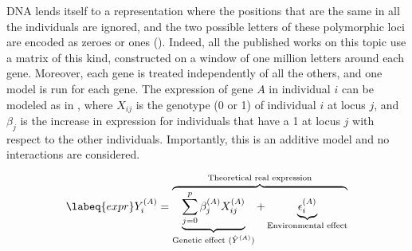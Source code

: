 DNA lends itself to a representation where the positions that are the 
same in all the individuals are ignored, and the two possible letters of 
these polymorphic loci are encoded as zeroes or ones 
(). Indeed, all the published works on this topic 
use a matrix of this kind, constructed on a window of one million 
letters around each gene. Moreover, each gene is treated independently 
of all the others, and one model is run for each gene. The expression of 
gene $A$ in individual $i$ can be modeled as in , where 
$X_{ij}$ is the genotype (0 or 1) of individual $i$ at locus $j$, and 
$\beta_j$ is the increase in expression for individuals that have a 1 at 
locus $j$ with respect to the other individuals. Importantly, this is an 
additive model and no interactions are considered.

\begin{equation}
  \labeq{expr}
  Y_i^{(A)} = \overbrace{\underbrace{\sum_{j=0}^p \beta_j^{(A)} X_{ij}^{(A)}}_{\text{Genetic effect ($\hat{Y}^{(A)}$)}} + \underbrace{\epsilon_i^{(A)}}_{\text{Environmental effect}}}^{\text{Theoretical real expression}}
\end{equation}
